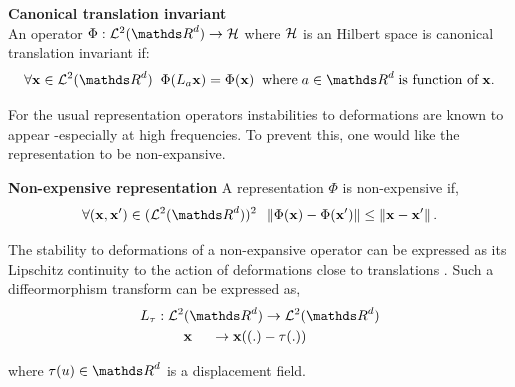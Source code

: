 \documentclass[a4paper,11pt]{report}
\begin{document}
      \begin{defn} \textbf{Canonical translation invariant}\\ 
				An operator $\Phi: \mcalL^{2}(\dsR^{d}) \rightarrow \mcalH$ where $\mathcal{H}$ is an Hilbert space is canonical translation invariant if:
        \begin{equation*}
			  		\forall \bfx \in \mcalL^{2}(\dsR^{d}) \;\;
			  		\Phi(L_{a}\bfx) = \Phi(\bfx) 
			  		\;\; \text{where} \; a \in \dsR^{d} \; \text{is function of} \; \bfx.
				\end{equation*}
				\label{def:Canonical translation invariance - intuition}
      \end{defn}
      
      For the usual representation operators instabilities to deformations are known to appear -especially at high frequencies. To prevent this, one would like the representation to be non-expansive.
      
      \begin{defn} \textbf{Non-expensive representation}
				A representation $\Phi$ is non-expensive if,
				\begin{equation}
			  		\forall (\bfx,\bfx') \in (\mcalL^{2}(\dsR^{d}))^{2} \;\; 
			  		\norm{\Phi(\bfx) - \Phi(\bfx')} \leq \norm{\bfx-\bfx'}.
				\end{equation}
				\label{def:Non-expansivity - intuition}
      \end{defn}
      
      The stability to deformations of a non-expansive operator can be expressed as its Lipschitz continuity to the action of deformations close to translations \cite{mallat2012gis}. Such a diffeormorphism transform can be expressed as,
      \begin{equation*}
      		\begin{split}
      			L_{\tau}	: \; & \mcalL^{2}(\dsR^{d}) \rightarrow \mcalL^{2}(\dsR^{d})\\
      							  & \;\;\;\; \bfx \;\;\;\;\; \rightarrow  \bfx((.) - \tau(.))
				\end{split}
      \end{equation*}

			where $\tau(u) \in \dsR^{d}$ is a displacement field.
			
\end{document}
